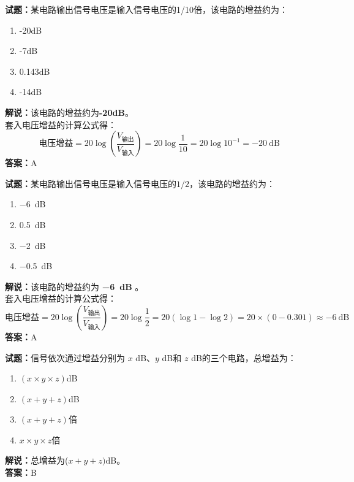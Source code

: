 \documentclass{ctexbook}
\begin{document}
\bigskip




\noindent\textbf{试题：}某电路输出信号电压是输入信号电压的1/10倍，该电路的增益约为：
\begin{enumerate}[leftmargin=3em]
\item -20dB
\item -7dB
\item 0.143dB
\item -14dB
\end{enumerate}
\noindent\textbf{解说：}该电路的增益约为\textbf{-20dB}。\\
套入电压增益的计算公式得：
$$\mbox{电压增益}=20 \log \left( {\frac{V_{ \mbox{输出} }}{V_{ \mbox{输入} }}} \right)=20 \log \frac{1}{10}=20 \log 10^{-1}= -20 \ \mathrm{dB}$$
\noindent\textbf{答案：}A

\bigskip




\noindent\textbf{试题：}某电路输出信号电压是输入信号电压的\(1/2\)，该电路的增益约为：
\begin{enumerate}[leftmargin=3em]
\item \SI{-6}{\dB}
\item \SI{0.5}{\dB}
\item \SI{-2}{\dB}
\item \SI{-0.5}{\dB}
\end{enumerate}
\noindent\textbf{解说：}该电路的增益约为\textbf{ \SI{-6}{\dB} }。\\
套入电压增益的计算公式得：
$$\mbox{电压增益}=20 \log \left( {\frac{V_{ \mbox{输出} }}{V_{ \mbox{输入} }}} \right)=20 \log \frac{1}{2}=20 \left( \log 1 - \log 2 \right) = 20 \times \left( 0 - 0.301 \right) \approx -6 \ \mathrm{dB}$$
\noindent\textbf{答案：}A

\bigskip




\noindent\textbf{试题：}信号依次通过增益分别为 \(x\) \si{\dB}、\(y\) \si{\dB}和 \(z\) \si{\dB}的三个电路，总增益为：
\begin{enumerate}[leftmargin=3em]
\item \((x \times y \times z)\)\si{\dB}
\item \((x + y + z)\)\si{\dB}
\item \((x + y + z)\)倍
\item \(x \times y \times z\)倍
\end{enumerate}
\noindent\textbf{解说：}总增益为(\(x + y + z)\)\si{\dB}。\\\noindent\textbf{答案：}B
\end{document}

